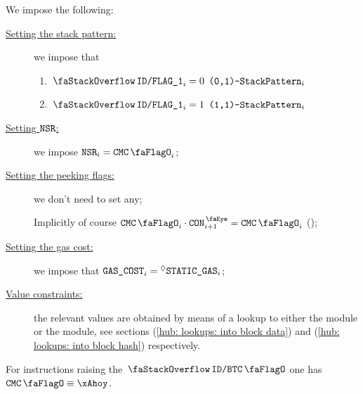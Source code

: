 \begin{center}
\end{center}
We impose the following:
\begin{description}
	\item[\underline{Setting the stack pattern:}]
		we impose that
	\begin{enumerate}
		\item \If $\decFlag{1} _{i} = 0$ \Then $\texttt{(0,1)-}\texttt{StackPattern} _{i}$
		\item \If $\decFlag{1} _{i} = 1$ \Then $\texttt{(1,1)-}\texttt{StackPattern}  _{i}$
	\end{enumerate}
	\item[\underline{Setting $\texttt{NSR}$:}]
		we impose $\nonStackRows_{i} = \cmc_{i}$;
	\item[\underline{Setting the peeking flags:}]
		we don't need to set any;

		\saNote{}
		Implicitly of course $\cmc_{i} \cdot \peekContext_{i + 1} = \cmc_{i}$ (\trash);
	\item[\underline{Setting the gas cost:}]
		we impose that $\texttt{GAS}\texttt{\_COST}_{i} = \prescript{\lozenge}{}{\texttt{STATIC\_GAS}}_{i}$;
	\item[\underline{Value constraints:}]
		the relevant values are obtained by means of a lookup to either the \btcMod{} module or the \blockHashMod{} module,
		see sections
		(\ref{hub: lookups: into block data}) and
		(\ref{hub: lookups: into block hash}) respectively.
\end{description}
\saNote{}
For instructions raising the $\stackDecBtcFlag$ one has $\cmc \equiv \xAhoy$.
